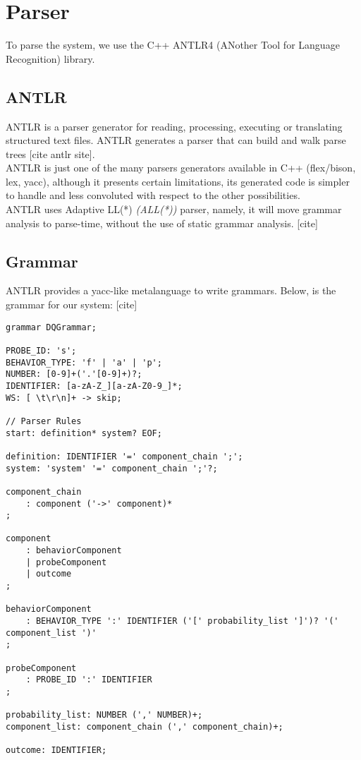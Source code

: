 \section{Parser}
        To parse the system, we use the C++ ANTLR4 (ANother Tool for Language Recognition) library. 
        \subsection{ANTLR}
    ANTLR is a parser generator for reading, processing, executing or translating structured text files. ANTLR generates a parser that can build and walk parse trees [cite antlr site]. \\
 ANTLR is just one of the many parsers generators available in C++ (flex/bison, lex, yacc), although it presents certain limitations, its generated code is simpler to handle and less convoluted with respect to the other possibilities. \\
        ANTLR uses Adaptive LL(*) \textit{(ALL(*))} parser, namely, it will move grammar analysis to parse-time, without the use of static grammar analysis. [cite]

        \subsection{Grammar}
            ANTLR provides a yacc-like metalanguage to write grammars. Below, is the grammar for our system: [cite]
            \begin{verbatim} 
grammar DQGrammar;

PROBE_ID: 's';
BEHAVIOR_TYPE: 'f' | 'a' | 'p';
NUMBER: [0-9]+('.'[0-9]+)?;
IDENTIFIER: [a-zA-Z_][a-zA-Z0-9_]*;
WS: [ \t\r\n]+ -> skip;

// Parser Rules
start: definition* system? EOF;

definition: IDENTIFIER '=' component_chain ';';
system: 'system' '=' component_chain ';'?;

component_chain
    : component ('->' component)*
;

component
    : behaviorComponent
    | probeComponent
    | outcome
;

behaviorComponent
    : BEHAVIOR_TYPE ':' IDENTIFIER ('[' probability_list ']')? '(' component_list ')'
;

probeComponent
    : PROBE_ID ':' IDENTIFIER
;

probability_list: NUMBER (',' NUMBER)+;
component_list: component_chain (',' component_chain)+;

outcome: IDENTIFIER;
        \end{verbatim}
             
